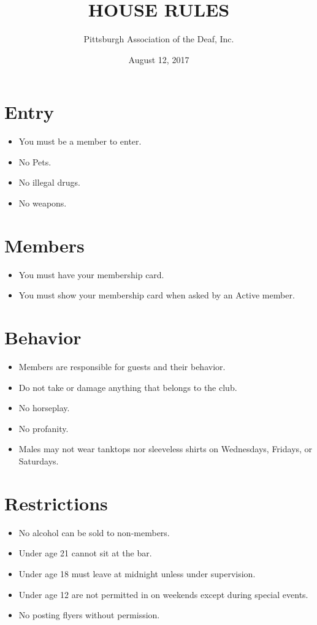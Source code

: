 \documentclass[12pt,letterpaper]{article}
\title{HOUSE RULES}
\author{Pittsburgh Association of the Deaf, Inc.}
\date{August 12, 2017}
\begin{document}
\maketitle

\section*{Entry}
\begin{itemize}
\item You must be a member to enter.
\item No Pets.
\item No illegal drugs.
\item No weapons.
\end{itemize}

\section*{Members}
\begin{itemize}
\item You must have your membership card.
\item You must show your membership card when asked by an Active member.
\end{itemize}

\section*{Behavior}
\begin{itemize}
\item Members are responsible for guests and their behavior.
\item Do not take or damage anything that belongs to the club.
\item No horseplay.
\item No profanity.
\item Males may not wear tanktops nor sleeveless shirts on Wednesdays, Fridays, or Saturdays.
\end{itemize}

\section*{Restrictions}
\begin{itemize}
\item No alcohol can be sold to non-members.
\item Under age 21 cannot sit at the bar.
\item Under age 18 must leave at midnight unless under supervision.
\item Under age 12 are not permitted in on weekends except during special events.
\item No posting flyers without permission.
\end{itemize}
\end{document}
